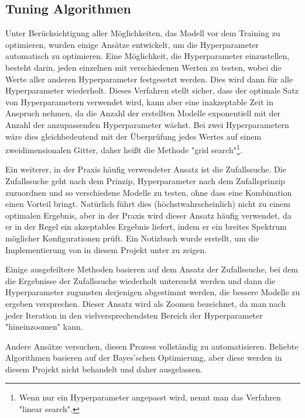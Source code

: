 \subsection{Tuning Algorithmen}

Unter Berücksichtigung aller Möglichkeiten, das Modell vor dem Training zu optimieren, wurden einige Ansätze entwickelt, um die Hyperparameter automatisch zu optimieren.
Eine Möglichkeit, die Hyperparameter einzustellen, besteht darin, jeden einzelnen mit verschiedenen Werten zu testen, wobei die Werte aller anderen Hyperparameter festgesetzt werden.
Dies wird dann für alle Hyperparameter wiederholt.
Dieses Verfahren stellt sicher, dass der optimale Satz von Hyperparametern verwendet wird, kann aber eine inakzeptable Zeit in Anspruch nehmen, da die Anzahl der erstellten Modelle exponentiell mit der Anzahl der anzupassenden Hyperparameter wächst.
Bei zwei Hyperparametern wäre dies gleichbedeutend mit der Überprüfung jedes Wertes auf einem zweidimensionalen Gitter, daher heißt die Methode "grid search"\footnote{Wenn nur ein Hyperparameter angepasst wird, nennt man das Verfahren "linear search".}.

Ein weiterer, in der Praxis häufig verwendeter Ansatz ist die Zufallssuche.
Die Zufallssuche geht nach dem Prinzip, Hyperparameter nach dem Zufallsprinzip zuzuordnen und so verschiedene Modelle zu testen, ohne dass eine Kombination einen Vorteil bringt.
Natürlich führt dies (höchstwahrscheinlich) nicht zu einem optimalen Ergebnis, aber in der Praxis wird dieser Ansatz häufig verwendet, da er in der Regel ein akzeptables Ergebnis liefert, indem er ein breites Spektrum möglicher Konfigurationen prüft.
Ein Notizbuch wurde erstellt, um die Implementierung von  in diesem Projekt unter  zu zeigen.

Einige ausgefeiltere Methoden basieren auf dem Ansatz der Zufallssuche, bei dem die Ergebnisse der Zufallssuche wiederholt untersucht werden und dann die Hyperparameter zugunsten derjenigen abgestimmt werden, die bessere Modelle zu ergeben versprechen.
Dieser Ansatz wird als Zoomen bezeichnet, da man nach jeder Iteration in den vielversprechendsten Bereich der Hyperparameter "hineinzoomen" kann.

Andere Ansätze versuchen, diesen Prozess vollständig zu automatisieren.
Beliebte Algorithmen basieren auf der Bayes'schen Optimierung, aber diese werden in diesem Projekt nicht behandelt und daher ausgelassen.

